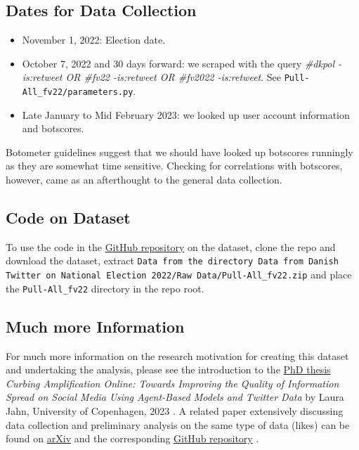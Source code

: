\documentclass[10pt,english,sigconf,authoryear,nonacm]{article}
\begin{document}
\subsection*{Dates for Data Collection}
\begin{itemize}
\item November 1, 2022: Election date.
\item October 7, 2022 and 30 days forward: we scraped with the query \emph{\#dkpol
-is:retweet OR \#fv22 -is:retweet OR \#fv2022 -is:retweet}. See \texttt{Pull-All\_fv22/parameters.py}.
\item Late January to Mid February 2023: we looked up user account information
and botscores.
\end{itemize}
Botometer guidelines suggest that we should have looked up botscores
runningly as they are somewhat time sensitive. Checking for correlations
with botscores, however, came as an afterthought to the general data
collection.\medskip{}


\subsection*{Code on Dataset}

To use the code in the \href{https://github.com/LJ-9/Danish-Election-2022-Twitter-Likes-Retweets-Botscores-Inauthentic-Coordinated-Behavior}{GitHub repository}
on the dataset, clone the repo and download the dataset, extract \texttt{Data
from the directory Data from Danish Twitter on National Election 2022/Raw
Data/Pull-All\_fv22.zip} and place the \texttt{Pull-All\_fv22} directory
in the repo root.\medskip{}


\subsection*{Much more Information}

For much more information on the research motivation for creating
this dataset and undertaking the analysis, please see the introduction
to the \href{https://github.com/LJ-9/Danish-Election-2022-Twitter-Likes-Retweets-Botscores-Inauthentic-Coordinated-Behavior/blob/main/documents/Jahn_Laura_PhD_Thesis_2023_online.pdf}{PhD thesis} \emph{Curbing Amplification Online: Towards Improving the Quality of Information Spread on Social Media Using Agent-Based Models and Twitter Data}
by Laura Jahn, University of Copenhagen, 2023 \cite{LauraThesis}.
A related paper extensively discussing data collection and preliminary
analysis on the same type of data (likes) can be found on \href{https://arxiv.org/abs/2305.07384}{arXiv}
\cite{JahnRendsvigTwitterLikesCIB} and the corresponding \href{https://github.com/humanplayer2/get-twitter-likers-data}{GitHub repository}
\cite{JahnRendsvig22GetLikers}.
\end{document}
